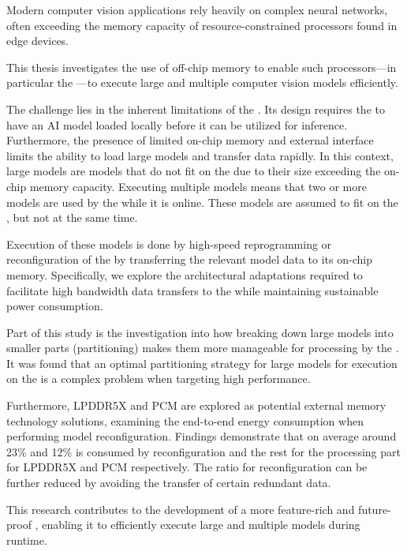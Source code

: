 Modern computer vision applications rely heavily on complex neural networks, often exceeding the memory capacity of resource-constrained processors found in edge devices.

This thesis investigates the use of off-chip memory to enable such processors---in particular the \graicore{}---to execute large and multiple computer vision models efficiently.

The challenge lies in the inherent limitations of the \graicore{}.
Its design requires the \graicore{} to have an AI model loaded locally before it can be utilized for inference.
Furthermore, the presence of limited on-chip memory and external interface limits the ability to load large models and transfer data rapidly.
In this context, large models are models that do not fit on the \graicore{} due to their size exceeding the on-chip memory capacity.
Executing multiple models means that two or more models are used by the \graicore{} while it is online.
These models are assumed to fit on the \graicore{}, but not at the same time.

Execution of these models is done by high-speed reprogramming or reconfiguration of the \graicore{} by transferring the relevant model data to its on-chip memory.
Specifically, we explore the architectural adaptations required to facilitate high bandwidth data transfers to the \graicore{} while maintaining sustainable power consumption.

Part of this study is the investigation into how breaking down large models into smaller parts (partitioning) makes them more manageable for processing by the \graicore{}.
It was found that an optimal partitioning strategy for large models for execution on the \graicore{} is a complex problem when targeting high performance.

Furthermore, LPDDR5X and PCM are explored as potential external memory technology solutions, examining the end-to-end energy consumption when performing model reconfiguration.
Findings demonstrate that on average around 23\% and 12\% is consumed by reconfiguration and the rest for the processing part for LPDDR5X and PCM respectively.
The ratio for reconfiguration can be further reduced by avoiding the transfer of certain redundant data.

This research contributes to the development of a more feature-rich and future-proof \graicore{}, enabling it to efficiently execute large and multiple models during runtime.
